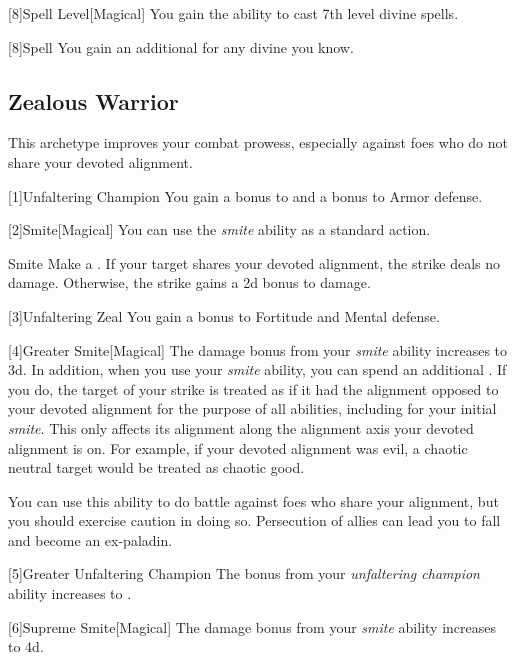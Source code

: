         [8]{Spell Level}[Magical] You gain the ability to cast 7th level divine spells.

        [8]{Spell} You gain an additional  for any divine  you know.

    \subsection{Zealous Warrior}
        This archetype improves your combat prowess, especially against foes who do not share your devoted alignment.

        [1]{Unfaltering Champion}
        You gain a  bonus to  and a  bonus to Armor defense.

        [2]{Smite}[Magical] You can use the \textit{smite} ability as a standard action.
        \begin{apability}{Smite}
            Make a .
            If your target shares your devoted alignment, the strike deals no damage.
            Otherwise, the strike gains a \plus2d bonus to damage.
        \end{apability}

        [3]{Unfaltering Zeal}
        You gain a  bonus to Fortitude and Mental defense.

        [4]{Greater Smite}[Magical] The damage bonus from your \textit{smite} ability increases to \plus3d.
        In addition, when you use your \textit{smite} ability, you can spend an additional .
        If you do, the target of your strike is treated as if it had the alignment opposed to your devoted alignment for the purpose of all abilities, including for your initial \textit{smite}.
        This only affects its alignment along the alignment axis your devoted alignment is on.
        For example, if your devoted alignment was evil, a chaotic neutral target would be treated as chaotic good.

        You can use this ability to do battle against foes who share your alignment, but you should exercise caution in doing so.
        Persecution of allies can lead you to fall and become an ex-paladin.

        [5]{Greater Unfaltering Champion} The  bonus from your \textit{unfaltering champion} ability increases to .

        [6]{Supreme Smite}[Magical] The damage bonus from your \textit{smite} ability increases to \plus4d.

